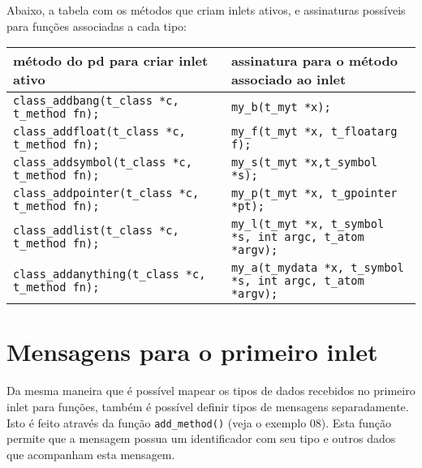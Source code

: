 Abaixo, a tabela com os métodos que criam inlets ativos,
e assinaturas possíveis para funções associadas a cada tipo:

\begin{center}
\begin{tabular}{|l|l|}
\hline
método do pd para criar inlet ativo & assinatura para o método associado ao
inlet \\
\hline
\texttt{class\_addbang(t\_class *c, t\_method fn);}   & \texttt{my\_b(t\_myt *x);} \\
\texttt{class\_addfloat(t\_class *c, t\_method fn);}  & \texttt{my\_f(t\_myt *x, t\_floatarg f);} \\
\texttt{class\_addsymbol(t\_class *c, t\_method fn);} & \texttt{my\_s(t\_myt *x,t\_symbol *s);} \\
\texttt{class\_addpointer(t\_class *c, t\_method fn);}& \texttt{my\_p(t\_myt *x, t\_gpointer *pt);} \\
\texttt{class\_addlist(t\_class *c, t\_method fn);}   & \texttt{my\_l(t\_myt *x, t\_symbol *s, int argc, t\_atom *argv);} \\
\texttt{class\_addanything(t\_class *c, t\_method fn);}& \texttt{my\_a(t\_mydata *x, t\_symbol *s, int argc, t\_atom *argv);} \\
\hline
\end{tabular}
\end{center}

\section{Mensagens para o primeiro inlet}

Da mesma maneira que é possível mapear os tipos de dados recebidos no primeiro
inlet para funções, também é possível definir tipos de mensagens separadamente.
Isto é feito através da função \texttt{add\_method()} (veja o exemplo 08).
Esta função permite que a mensagem possua um identificador com seu tipo e outros
dados que acompanham esta mensagem.

